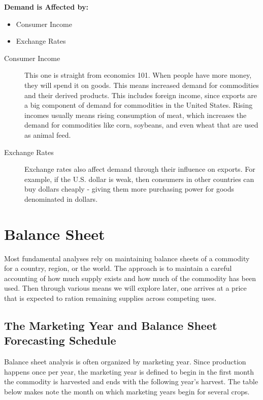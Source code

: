 \documentclass[
]{book}
\providecommand{\tightlist}{%
  \setlength{\itemsep}{0pt}\setlength{\parskip}{0pt}}
\begin{document}
\textbf{Demand is Affected by:}

\begin{itemize}
\tightlist
\item
  Consumer Income
\item
  Exchange Rates
\end{itemize}

\begin{description}
\item[Consumer Income]
This one is straight from economics 101. When people have more money, they will spend it on goods. This means increased demand for commodities and their derived products. This includes foreign income, since exports are a big component of demand for commodities in the United States. Rising incomes usually means rising consumption of meat, which increases the demand for commodities like corn, soybeans, and even wheat that are used as animal feed.
\item[Exchange Rates]
Exchange rates also affect demand through their influence on exports. For example, if the U.S. dollar is weak, then consumers in other countries can buy dollars cheaply - giving them more purchasing power for goods denominated in dollars.
\end{description}

\hypertarget{balance-sheet}{%
\section{Balance Sheet}\label{balance-sheet}}

Most fundamental analyses rely on maintaining balance sheets of a commodity for a country, region, or the world. The approach is to maintain a careful accounting of how much supply exists and how much of the commodity has been used. Then through various means we will explore later, one arrives at a price that is expected to ration remaining supplies across competing uses.

\hypertarget{the-marketing-year-and-balance-sheet-forecasting-schedule}{%
\subsection{The Marketing Year and Balance Sheet Forecasting Schedule}\label{the-marketing-year-and-balance-sheet-forecasting-schedule}}

Balance sheet analysis is often organized by marketing year. Since production happens once per year, the marketing year is defined to begin in the first month the commodity is harvested and ends with the following year's harvest. The table below makes note the month on which marketing years begin for several crops.
\end{document}
